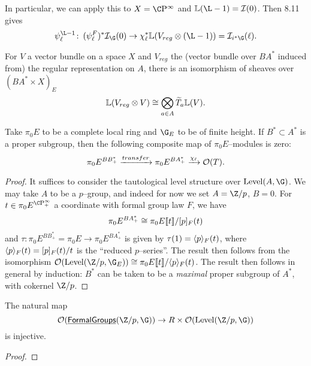 In particular, we can apply this to $X = \CP^\infty$ and $\ThomSheaf{\L - 1} = \sheaf I(0)$.  Then 8.11 gives \[\psi_\ell^{\L - 1} \co (\psi_\ell^F)^* \sheaf I_{\G}(0) \to \chi_\ell^* \ThomSheaf{V_{reg} \otimes (\L - 1)} = \sheaf I_{i^* \G}(\ell).\]


\begin{lemma}
For $V$ a vector bundle on a space $X$ and $V_{reg}$ the (vector bundle over $BA^*$ induced from) the regular representation on $A$, there is an isomorphism of sheaves over $(BA^* \times X)_E$ \[\mathbb{L}(V_{reg} \otimes V) \cong \bigotimes_{a \in A} \widetilde T_a \mathbb{L}(V).\]
\end{lemma}

\begin{lemma}
Take $\pi_0 E$ to be a complete local ring and $\G_E$ to be of finite height.  If $B^* \subset A^*$ is a proper subgroup, then the following composite map of $\pi_0 E$--modules is zero: \[\pi_0 E^{BB^*_+} \xrightarrow{transfer} \pi_0 E^{BA^*_+} \xrightarrow{\chi_\ell} \mathcal{O}(T).\]
\end{lemma}
\begin{proof}
It suffices to consider the tautological level structure over $\Level(A, \G)$.  We may take $A$ to be a $p$--group, and indeed for now we set $A = \Z/p$, $B = 0$.  For $t \in \pi_0 E^{\CP^\infty_+}$ a coordinate with formal group law $F$, we have \[\pi_0 E^{BA^*_+} \cong \pi_0 E \llbracket{t}\rrbracket / [p]_F(t)\] and $\tau: \pi_0 E^{BB^*_+} = \pi_0 E \to \pi_0 E^{BA^*_+}$ is given by $\tau(1) = \langle p\rangle_F(t)$, where $\langle p\rangle_F(t) = [p]_F(t) / t$ is the ``reduced $p$--series''.  The result then follows from the isomorphism $\sheaf O(\Level(\Z/p, \G_E)) \cong \pi_0 E\ps{t} / \<p\>_F(t)$.  The result then follows in general by induction: $B^*$ can be taken to be a \emph{maximal} proper subgroup of $A^*$, with cokernel $\Z/p$.
\end{proof}

\begin{lemma} 
The natural map \[\sheaf O(\InternalHom{FormalGroups}(\Z/p, \G)) \to R \times \sheaf O(\Level(\Z/p, \G))\] is injective.
\end{lemma}
\begin{proof}
\end{proof}

